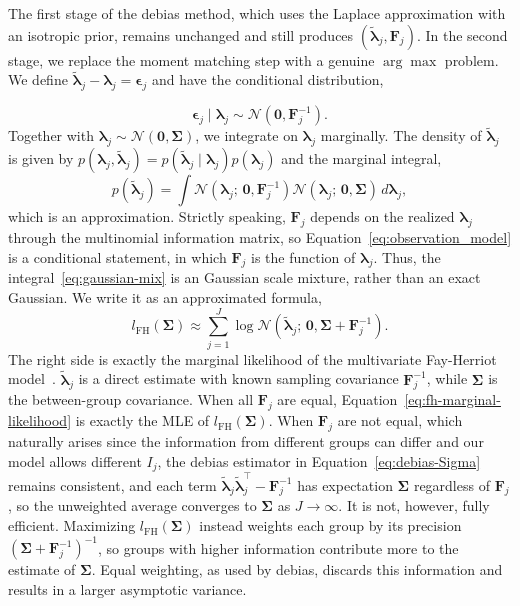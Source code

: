 The first stage of the debias method, which uses the Laplace approximation with an isotropic prior, remains unchanged and still produces $(\tilde{\bm{\lambda}}_j,\mathbf{F}_j)$. In the second stage, we replace the moment matching step with a genuine $\arg\max$ problem. We define $\tilde{\bm{\lambda}}_{j}-\bm{\lambda}_{j}=\bm{\epsilon}_j$ and have the conditional distribution,

\begin{equation} 
    \bm{\epsilon}_{j}\mid \bm{\lambda}_{j} \sim \mathcal{N}\left(\mathbf{0}, \mathbf{F}_j^{-1}\right). 
    \label{eq:observation_model} 
\end{equation} 
Together with $\bm{\lambda}_{j}\sim \mathcal{N}\left(\bm{0},\bm{\Sigma}\right)$, we integrate on $\bm{\lambda}_{j}$ marginally. The density of $\tilde{\bm{\lambda}}_{j}$ is given by $p\left(\bm{\lambda}_{j},\tilde{\bm{\lambda}}_{j}\right)=p\left(\tilde{\bm{\lambda}}_{j}\mid \bm{\lambda}_{j}\right)p\left(\bm{\lambda}_{j}\right)$ and the marginal integral,
\begin{equation}
    p\left(\tilde{\bm{\lambda}}_{j}\right)=\int \mathcal{N}\left( \bm{\lambda}_{j};\,\bm{0},\mathbf{F}_{j}^{-1}\right)\mathcal{N}\left(\bm{\lambda}_{j};\,\bm{0},\bm{\Sigma}\right)\,d\bm{\lambda}_{j},
    \label{eq:gaussian-mix}
\end{equation}
which is an approximation. Strictly speaking, $\mathbf{F}_j$ depends on the realized $\bm{\lambda}_j$ through the multinomial information matrix, so Equation~\eqref{eq:observation_model} is a conditional statement, in which $\mathbf{F}_{j}$ is the function of $\bm{\lambda}_{j}$. Thus, the integral~\eqref{eq:gaussian-mix} is an Gaussian scale mixture, rather than an exact Gaussian. We write it as an approximated formula,
\begin{equation} 
    l_{\mathrm{FH}}(\bm{\Sigma}) \approx \sum_{j=1}^{J} \log \mathcal{N}\left(\tilde{\bm{\lambda}}_j;\, \mathbf{0}, \bm{\Sigma} + \mathbf{F}_j^{-1}\right). 
    \label{eq:fh-marginal-likelihood} 
\end{equation}
The right side is exactly the marginal likelihood of the multivariate Fay-Herriot model~\citep{Herriot1979, Pfeffermann2011}. $\tilde{\bm{\lambda}}_j$ is a direct estimate with known sampling covariance $\mathbf{F}_j^{-1}$, while $\bm{\Sigma}$ is the between-group covariance. When all $\mathbf{F}_j$ are equal, Equation~\eqref{eq:fh-marginal-likelihood} is exactly the MLE of $l_{\text{FH}}(\bm{\Sigma})$. When $\mathbf{F}_j$ are not equal, which naturally arises since the information from different groups can differ and our model allows different $I_j$, the debias estimator in Equation~\eqref{eq:debias-Sigma} remains consistent, and each term $\tilde{\bm{\lambda}}_j\tilde{\bm{\lambda}}_j^{\top}-\mathbf{F}_j^{-1}$ has expectation $\bm{\Sigma}$ regardless of $\mathbf{F}_j$, so the unweighted average converges to $\bm{\Sigma}$ as $J\to\infty$. It is not, however, fully efficient. Maximizing $l_{\text{FH}}(\bm{\Sigma})$ instead weights each group by its precision $(\bm{\Sigma}+\mathbf{F}_j^{-1})^{-1}$, so groups with higher information contribute more to the estimate of $\bm{\Sigma}$. Equal weighting, as used by debias, discards this information and results in a larger asymptotic variance.

